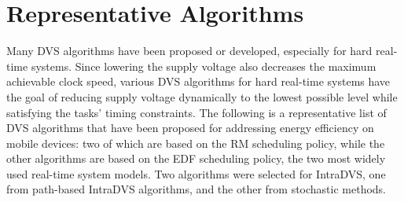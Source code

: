 \documentclass[10pt,article]{IEEEtran}
\begin{document}
\section{Representative Algorithms} \label{hard-rt-algs}
Many DVS algorithms have been proposed or developed, especially for hard real-time systems. Since lowering the supply voltage also decreases the maximum achievable clock speed, various DVS algorithms for hard real-time systems have the goal of reducing supply voltage dynamically to the lowest possible level while satisfying the tasks' timing constraints\cite{kim-2}. The following is a representative list of DVS algorithms that have been proposed for addressing energy efficiency on mobile devices: two of which are based on the RM scheduling policy, while the other algorithms are based on the EDF scheduling policy, the two most widely used real-time system models\cite{w-s-liu}. Two algorithms were selected for IntraDVS, one from path-based IntraDVS algorithms, and the other from stochastic methods.
\end{document}
